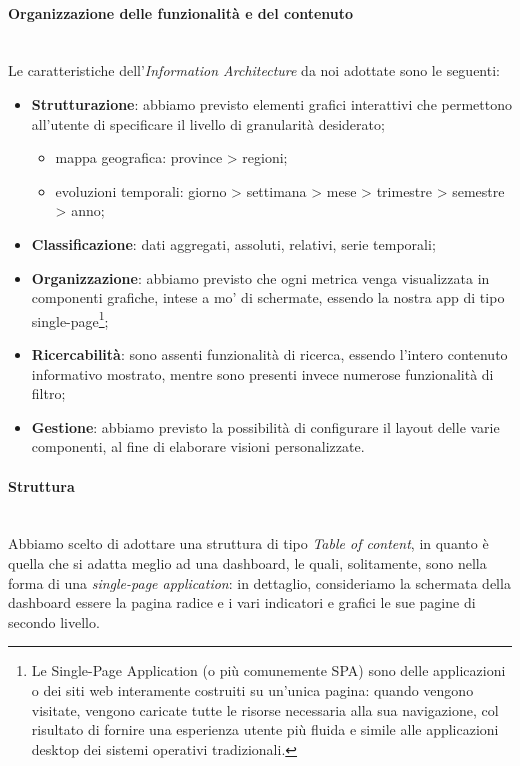 \paragraph{Organizzazione delle funzionalità e del contenuto}\mbox{}\\
Le caratteristiche dell'\textit{Information Architecture} da noi adottate sono le seguenti:
\begin{itemize}
	\item \textbf{Strutturazione}: abbiamo previsto elementi grafici interattivi che permettono all'utente di specificare il livello di granularità desiderato;
	\begin{itemize}
		\item mappa geografica: province > regioni;
		\item evoluzioni temporali: giorno > settimana > mese > trimestre > semestre > anno;
	\end{itemize}
	\item \textbf{Classificazione}: dati aggregati, assoluti, relativi, serie temporali;
	\item \textbf{Organizzazione}: abbiamo previsto che ogni metrica venga visualizzata in componenti grafiche, intese a mo' di schermate, essendo la nostra app di tipo single-page\footnote{Le Single-Page Application (o più comunemente SPA) sono delle applicazioni o dei siti web interamente costruiti su un’unica pagina: quando vengono visitate, vengono caricate tutte le risorse necessaria alla sua navigazione, col risultato di fornire una esperienza utente più fluida e simile alle applicazioni desktop dei sistemi operativi tradizionali.};
	\item \textbf{Ricercabilità}: sono assenti funzionalità di ricerca, essendo l'intero contenuto informativo mostrato, mentre sono presenti invece numerose funzionalità di filtro;
	\item \textbf{Gestione}: abbiamo previsto la possibilità di configurare il layout delle varie componenti, al fine di elaborare visioni personalizzate.
\end{itemize}

\paragraph{Struttura}\mbox{}\\
Abbiamo scelto di adottare una struttura di tipo \textit{Table of content}, in quanto è quella che si adatta meglio ad una dashboard, le quali, solitamente, sono nella forma di una \textit{single-page application}: in dettaglio, consideriamo la schermata della dashboard essere la pagina radice e i vari indicatori e grafici le sue pagine di secondo livello. 
